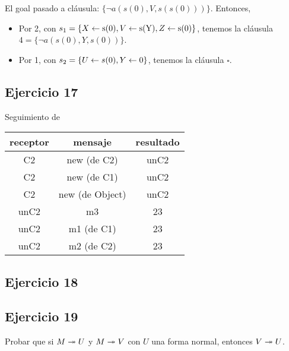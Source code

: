 El goal pasado a cláusula: $\{\lnot a(s(0),V,s(s(0)))\}$. Entonces,

\begin{itemize}
  \item Por 2, con $s_1=\{X\leftarrow \text{s(0)}, V\leftarrow \text{s(Y)}, Z\leftarrow \text{s(0)}\}$, tenemos la cláusula $4 = \{\lnot a(s(0), Y, s(0))\}$.
  \item Por 1, con $s_2=\{U\leftarrow s(0), Y\leftarrow 0\}$, tenemos la cláusula $\square$.
\end{itemize}

\subsection*{Ejercicio 17}

Seguimiento de 

\begin{tabular}{| c | c | c |}
  \hline
  receptor & mensaje & resultado \\ \hline
  C2 & new (de C2) & unC2 \\
  C2 & new (de C1) & unC2 \\
  C2 & new (de Object) & unC2 \\
  unC2 & m3 & 23 \\
  unC2 & m1 (de C1) & 23 \\
  unC2 & m2 (de C2) & 23 \\
  \hline
\end{tabular}

\subsection*{Ejercicio 18}


\subsection*{Ejercicio 19}

Probar que si $M \twoheadrightarrow U$ y $M \twoheadrightarrow V$ con $U$ una forma normal, entonces $V \twoheadrightarrow U$.

